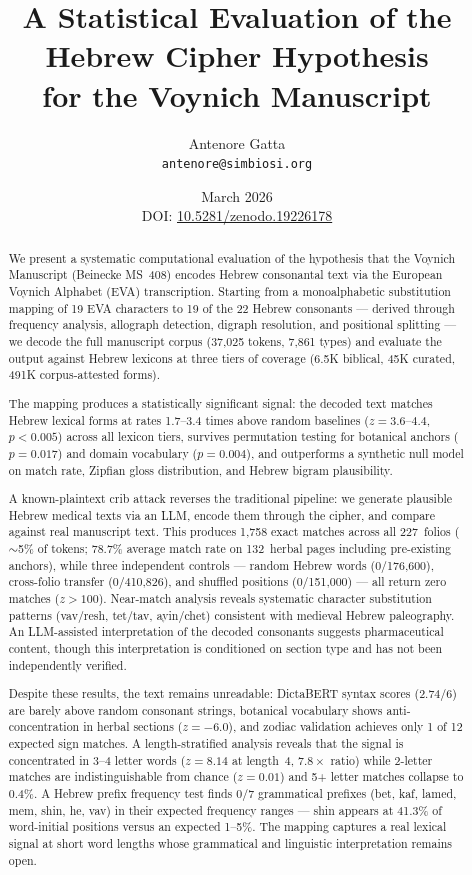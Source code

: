 \documentclass[11pt,a4paper]{article}
\title{A Statistical Evaluation of the Hebrew Cipher Hypothesis\\
for the Voynich Manuscript}
\author{Antenore Gatta\\
\small \texttt{antenore@simbiosi.org}}
\date{March 2026\\[2pt]
\small DOI: \href{https://doi.org/10.5281/zenodo.19226178}{10.5281/zenodo.19226178}}
\begin{document}
\maketitle

\begin{abstract}
We present a systematic computational evaluation of the hypothesis that the
Voynich Manuscript (Beinecke MS~408) encodes Hebrew consonantal text via the
European Voynich Alphabet (EVA) transcription. Starting from a monoalphabetic
substitution mapping of 19 EVA characters to 19 of the 22 Hebrew consonants
--- derived through frequency analysis, allograph detection, digraph resolution,
and positional splitting --- we decode the full manuscript corpus (37,025 tokens,
7,861 types) and evaluate the output against Hebrew lexicons at three tiers of
coverage (6.5K biblical, 45K curated, 491K corpus-attested forms).

The mapping produces a statistically significant signal: the decoded text
matches Hebrew lexical forms at rates 1.7--3.4 times above random baselines
($z=3.6$--$4.4$, $p<0.005$) across all lexicon tiers, survives permutation
testing for botanical anchors ($p=0.017$) and domain vocabulary ($p=0.004$),
and outperforms a synthetic null model on match rate, Zipfian gloss
distribution, and Hebrew bigram plausibility.

A known-plaintext crib attack reverses the traditional pipeline: we generate
plausible Hebrew medical texts via an LLM, encode them through the cipher,
and compare against real manuscript text. This produces 1{,}758 exact matches
across all 227~folios ($\sim$5\% of tokens; 78.7\% average match rate on
132~herbal pages including pre-existing anchors), while three independent
controls --- random Hebrew words (0/176{,}600), cross-folio transfer
(0/410{,}826), and shuffled positions (0/151{,}000) --- all return zero
matches ($z>100$). Near-match analysis reveals systematic character
substitution patterns (vav/resh, tet/tav, ayin/chet) consistent with medieval
Hebrew paleography. An LLM-assisted interpretation of the decoded consonants
suggests pharmaceutical content, though this interpretation is conditioned
on section type and has not been independently verified.

Despite these results, the text remains unreadable: DictaBERT syntax
scores (2.74/6) are barely above random consonant strings, botanical
vocabulary shows anti-concentration in herbal sections ($z=-6.0$),
and zodiac validation achieves only 1 of 12 expected sign matches.
A length-stratified analysis reveals that the signal is concentrated
in 3--4 letter words ($z=8.14$ at length~4, $7.8\times$ ratio) while
2-letter matches are indistinguishable from chance ($z=0.01$) and
5+ letter matches collapse to 0.4\%. A Hebrew prefix frequency test
finds 0/7 grammatical prefixes (bet, kaf, lamed, mem, shin, he, vav)
in their expected frequency ranges --- shin appears at 41.3\% of
word-initial positions versus an expected 1--5\%.
The mapping captures a real lexical signal at short word lengths
whose grammatical and linguistic interpretation remains open.
\end{abstract}
\end{document}
